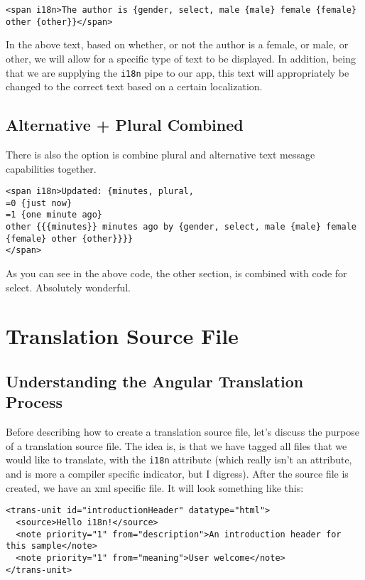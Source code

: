 \begin{lstlisting}
<span i18n>The author is {gender, select, male {male} female {female} other {other}}</span>  
\end{lstlisting}

In the above text, based on whether, or not the author is a female, or male, or other, we will allow for a specific type of text to be displayed. In addition, being that we are supplying the \lstinline{i18n} pipe to our app, this text will appropriately be changed to the correct text based on a certain localization.

\subsection{Alternative + Plural Combined}
There is also the option is combine plural and alternative text message capabilities 
together. 
\begin{lstlisting}
<span i18n>Updated: {minutes, plural,
=0 {just now}
=1 {one minute ago}
other {{{minutes}} minutes ago by {gender, select, male {male} female {female} other {other}}}}
</span>
\end{lstlisting}

As you can see in the above code, the other section, is combined with code for select. Absolutely wonderful. 

\section{Translation Source File}
\subsection{Understanding the Angular Translation Process}
Before describing how to create a translation source file, let's discuss the purpose of a translation source file. The idea is, is that we have tagged all files that we would like to translate, with the \lstinline{i18n} attribute (which really isn't an attribute, and is more a compiler specific indicator, but I digress). After the source file is created, we have an xml specific file. It will look something like this: 
\begin{lstlisting}[caption=src/locale/messages.xlf]
<trans-unit id="introductionHeader" datatype="html">
  <source>Hello i18n!</source>
  <note priority="1" from="description">An introduction header for this sample</note>
  <note priority="1" from="meaning">User welcome</note>
</trans-unit>
\end{lstlisting}

